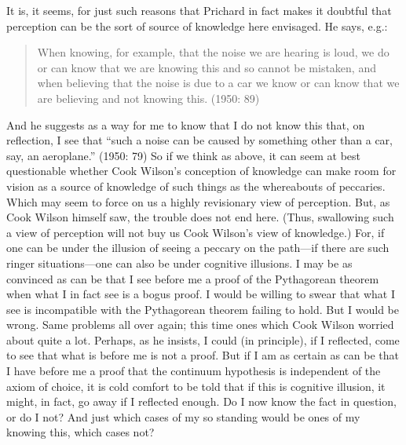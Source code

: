 It is, it seems, for just such reasons that Prichard in fact makes it doubtful that perception can be the sort of source of knowledge here envisaged. He says, e.g.:
\begin{quote}
	When knowing, for example, that the noise we are hearing is loud, we do or can know that we are knowing this and so cannot be mistaken, and when believing that the noise is due to a car we know or can know that we are believing and not knowing this. (1950: 89)
\end{quote}
And he suggests as a way for me to know that I do not know this that, on reflection, I see that ``such a noise can be caused by something other than a car, say, an aeroplane.'' (1950: 79) So if we think as above, it can seem at best questionable whether Cook Wilson’s conception of knowledge can make room for vision as a source of knowledge of such things as the whereabouts of peccaries. Which may seem to force on us a highly revisionary view of perception. But, as Cook Wilson himself saw, the trouble does not end here. (Thus, swallowing such a view of perception will not buy us Cook Wilson’s view of knowledge.) For, if one can be under the illusion of seeing a peccary on the path—if there are such ringer situations—one can also be under cognitive illusions. I may be as convinced as can be that I see before me a proof of the Pythagorean theorem when what I in fact see is a bogus proof. I would be willing to swear that what I see is incompatible with the Pythagorean theorem failing to hold. But I would be wrong. Same problems all over again; this time ones which Cook Wilson worried about quite a lot. Perhaps, as he insists, I could (in principle), if I reflected, come to see that what is before me is not a proof. But if I am as certain as can be that I have before me a proof that the continuum hypothesis is independent of the axiom of choice, it is cold comfort to be told that if this is cognitive illusion, it might, in fact, go away if I reflected enough. Do I now know the fact in question, or do I not? And just which cases of my so standing would be ones of my knowing this, which cases not?

